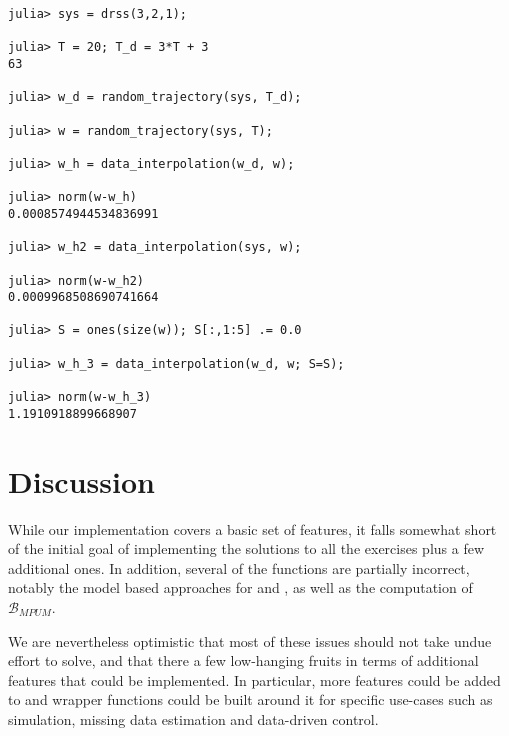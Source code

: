\documentclass[11pt]{article}
\def\B{\mathscr{B}}
\begin{document}
\begin{codebox}
\begin{verbatim}
julia> sys = drss(3,2,1);

julia> T = 20; T_d = 3*T + 3
63

julia> w_d = random_trajectory(sys, T_d);

julia> w = random_trajectory(sys, T);

julia> w_h = data_interpolation(w_d, w);

julia> norm(w-w_h)
0.0008574944534836991

julia> w_h2 = data_interpolation(sys, w);

julia> norm(w-w_h2)
0.0009968508690741664

julia> S = ones(size(w)); S[:,1:5] .= 0.0

julia> w_h_3 = data_interpolation(w_d, w; S=S);

julia> norm(w-w_h_3)
1.1910918899668907
\end{verbatim}
\end{codebox}

\section*{Discussion}
While our implementation covers a basic set of features, it falls somewhat short of the initial goal of implementing the solutions to all the exercises plus a few additional ones. In addition, several of the functions are partially incorrect, notably the model based approaches for  and , as well as the computation of $\B_{MPUM}$.

We are nevertheless optimistic that most of these issues should not take undue effort to solve, and that there a few low-hanging fruits in terms of additional features that could be implemented. In particular, more features could be added to  and wrapper functions could be built around it for specific use-cases such as simulation, missing data estimation and data-driven control.
\end{document}

